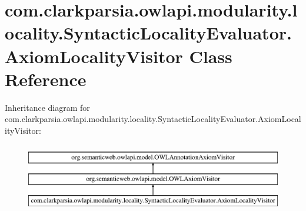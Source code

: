 \hypertarget{classcom_1_1clarkparsia_1_1owlapi_1_1modularity_1_1locality_1_1_syntactic_locality_evaluator_1_1_axiom_locality_visitor}{\section{com.\-clarkparsia.\-owlapi.\-modularity.\-locality.\-Syntactic\-Locality\-Evaluator.\-Axiom\-Locality\-Visitor Class Reference}
\label{classcom_1_1clarkparsia_1_1owlapi_1_1modularity_1_1locality_1_1_syntactic_locality_evaluator_1_1_axiom_locality_visitor}
}
Inheritance diagram for com.\-clarkparsia.\-owlapi.\-modularity.\-locality.\-Syntactic\-Locality\-Evaluator.\-Axiom\-Locality\-Visitor\-:\begin{figure}[H]
\begin{center}
\leavevmode
\includegraphics[height=3.000000cm]{classcom_1_1clarkparsia_1_1owlapi_1_1modularity_1_1locality_1_1_syntactic_locality_evaluator_1_1_axiom_locality_visitor}
\end{center}
\end{figure}
